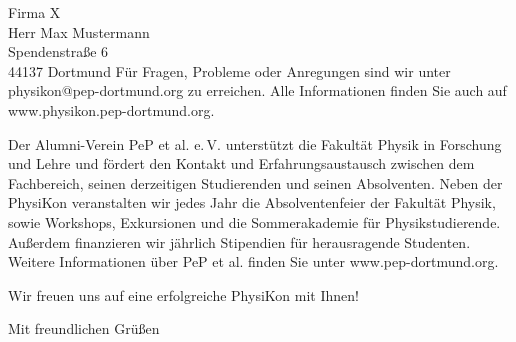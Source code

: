 \documentclass[
  pepbrief,
  fontsize=12pt,
  paper=a4,
  DIV=14,
  parskip=half,
  backaddress=false,
]{scrlttr2}
\begin{document}
\begin{letter}{%
  Firma X\\
  Herr Max Mustermann\\
  Spendenstraße 6\\
  44137 Dortmund%
}
Für Fragen, Probleme oder Anregungen sind wir unter physikon@pep-dortmund.org zu erreichen. Alle Informationen finden Sie auch auf www.physikon.pep-dortmund.org.

Der Alumni-Verein PeP et al. e.\,V. unterstützt die Fakultät Physik in Forschung und Lehre und fördert den Kontakt und Erfahrungsaustausch zwischen dem Fachbereich,
seinen derzeitigen Studierenden und seinen Absolventen. Neben der PhysiKon veranstalten wir jedes Jahr die Absolventenfeier der Fakultät Physik, sowie Workshops, Exkursionen
und die Sommerakademie für Physikstudierende. Außerdem finanzieren wir jährlich Stipendien für herausragende Studenten. Weitere Informationen über PeP et al. finden Sie unter
www.pep-dortmund.org.

Wir freuen uns auf eine erfolgreiche PhysiKon mit Ihnen!


\closing{Mit freundlichen Grüßen}

\end{letter}
\end{document}
